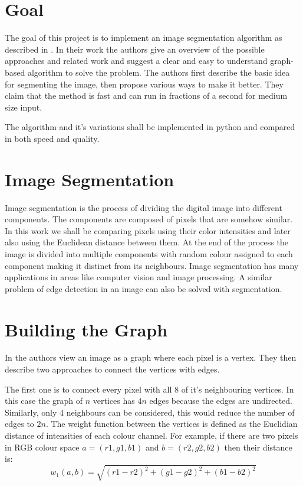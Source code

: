 \section{Goal}
The goal of this project is to implement an image segmentation algorithm 
as described in \cite{felzen04}. In their work the authors give an overview of the possible 
approaches and related work and suggest a clear and easy to understand graph-based algorithm to solve the problem. 
The authors first describe the basic idea for segmenting the image, then propose various
ways to make it better. They claim that the method is fast and can run in fractions of a second for medium size input.

The algorithm and it's variations shall be implemented in python and compared in both speed and quality.


\section{Image Segmentation}
Image segmentation is the process of dividing the digital image into different components. The components are composed
of pixels that are somehow similar. In this work we shall be comparing pixels using their color intensities and later
also using the Euclidean distance between them. At the end of the process the image is divided into multiple components
with random colour assigned to each component making it distinct from its neighbours. Image segmentation
has many applications in areas like computer vision and image processing. A similar problem of edge detection in an
image can also be solved with segmentation.


\section{Building the Graph}
In \cite{felzen04} the authors view an image as a graph where each pixel is a vertex. They then describe two approaches to 
connect the vertices with edges. 

The first one is to connect every pixel with all 8 of it's neighbouring vertices.
In this case the graph of $n$ vertices has $4n$ edges because the edges are undirected. Similarly, only 4 neighbours can be
considered, this would reduce the number of edges to $2n$. 
The weight function between the vertices is defined as the Euclidian distance of intensities of each colour channel.
For example, if there are two pixels in RGB colour space $a = (r1,g1,b1)$ and $b = (r2,g2,b2)$ then their distance is:
\[
w_1(a,b) = \sqrt{(r1-r2)^2 + (g1-g2)^2 + (b1-b2)^2}
\]

